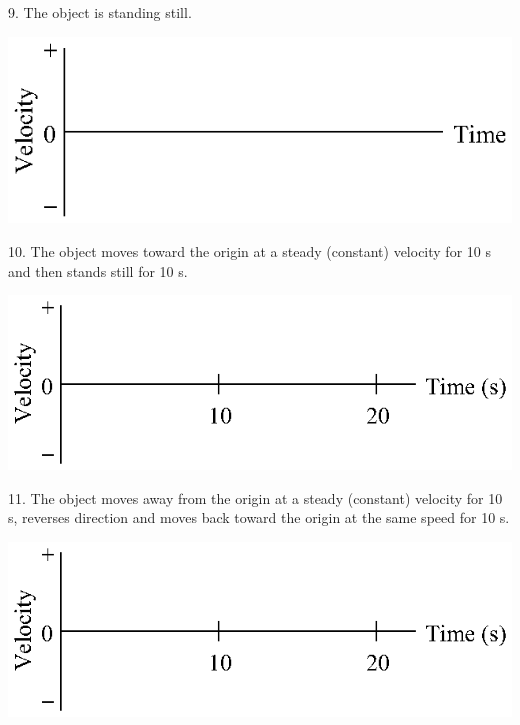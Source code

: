 9. The object is standing still.

\vspace{0.3cm}
{\par\centering \includegraphics{velocity/velocity_fig15.eps} \par}
\vspace{0.3cm}

10. The object moves toward the origin at a steady (constant) velocity for 10
s and then stands still for 10 s.

\vspace{0.3cm}
{\par\centering \includegraphics{velocity/velocity_fig16.eps} \par}
\vspace{0.3cm}

11. The object moves away from the origin at a steady (constant) velocity for
10 s, reverses direction and moves back toward the origin at the same speed
for 10 s.

\vspace{0.3cm}
{\par\centering \includegraphics{velocity/velocity_fig16.eps} \par}
\vspace{0.3cm}

